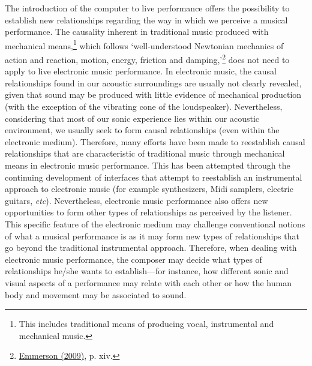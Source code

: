 The introduction of the computer to live performance offers the possibility to establish new relationships regarding the way in which we perceive a musical performance. The causality inherent in traditional music produced with mechanical means,\footnote{This includes traditional means of producing vocal, instrumental and mechanical music.} which follows `well-understood Newtonian mechanics of action and reaction, motion, energy, friction and damping,'\footnote{\hyperlink{emmersonliving}{Emmerson (2009)}, p. xiv.} does not need to apply to live electronic music performance. In electronic music, the causal relationships found in our acoustic surroundings are usually not clearly revealed, given that sound may be produced with little evidence of mechanical production (with the exception of the vibrating cone of the loudspeaker). Nevertheless, considering that most of our sonic experience lies within our acoustic environment, we usually seek to form causal relationships (even within the electronic medium). Therefore, many efforts have been made to reestablish causal relationships that are characteristic of traditional music through mechanical means in electronic music performance. This has been attempted through the continuing development of interfaces that attempt to reestablish an instrumental approach to electronic music (for example synthesizers, Midi samplers, electric guitars, \emph{etc}). Nevertheless, electronic music performance also offers new opportunities to form other types of relationships as perceived by the listener. This specific feature of the electronic medium may challenge conventional notions of what a musical performance is as it may form new types of relationships that go beyond the traditional instrumental approach. Therefore, when dealing with electronic music performance, the composer may decide what types of relationships he/she wants to establish---for instance, how different sonic and visual aspects of a performance may relate with each other or how the human body and movement may be associated to sound. 


